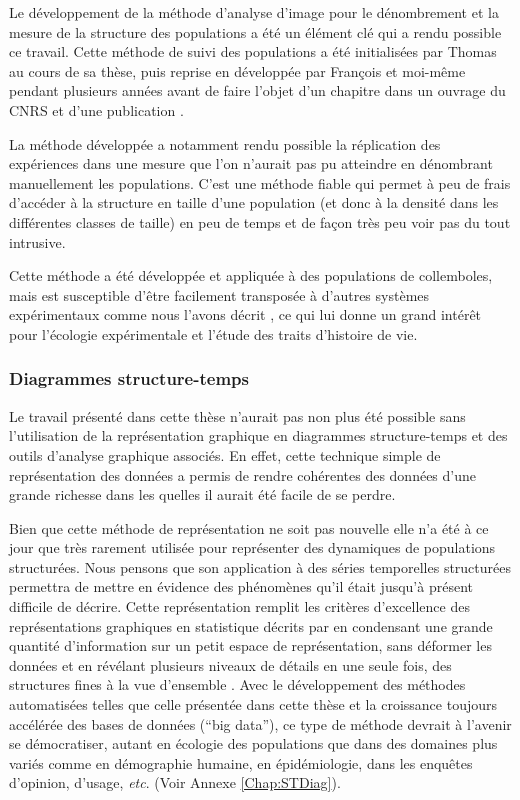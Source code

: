 Le développement de la méthode d'analyse d'image pour le dénombrement et la
mesure de la structure des populations a été un élément clé qui a rendu possible
ce travail. Cette méthode de suivi des populations a été initialisées par Thomas
\textcites{tully2004a} au cours de sa thèse, puis reprise en développée par
François \textcites{mallard2013b} et moi-même pendant plusieurs années avant de
faire l'objet d'un chapitre dans un ouvrage du CNRS \autocites{le-galliard2012a}
et d'une publication \autocites{mallard2013a}.

La méthode développée a notamment rendu possible la réplication des expériences
dans une mesure que l'on n'aurait pas pu atteindre en dénombrant manuellement
les populations. C'est une méthode fiable qui permet à peu de frais d'accéder à la
structure en taille d'une population (et donc à la densité dans les différentes
classes de taille) en peu de temps et de façon très peu voir pas du tout
intrusive.

Cette méthode a été développée et appliquée à des populations de collemboles,
mais est susceptible d'être facilement transposée à d'autres systèmes
expérimentaux comme nous l'avons décrit \autocites{mallard2013a}, ce qui lui
donne un grand intérêt pour l'écologie expérimentale et l'étude des traits
d'histoire de vie.

\subsubsection{Diagrammes structure-temps}

Le travail présenté dans cette thèse n'aurait pas non plus été possible sans
l'utilisation de la représentation graphique en diagrammes structure-temps et
des outils d'analyse graphique associés. En effet, cette technique simple de
représentation des données a permis de rendre cohérentes des données d'une
grande richesse dans les quelles il aurait été facile de se perdre.

Bien que cette méthode de représentation ne soit pas nouvelle elle n'a été à ce
jour que très rarement utilisée pour représenter des dynamiques de populations
structurées. Nous pensons que son application à des séries temporelles
structurées permettra de mettre en évidence des phénomènes qu'il était jusqu'à
présent difficile de décrire. Cette représentation remplit les critères
d'excellence des représentations graphiques en statistique décrits par
\textcites{tufte1990a} en condensant une grande quantité d'information sur un
petit espace de représentation, sans déformer les données et en révélant
plusieurs niveaux de détails en une seule fois, des structures fines à la vue
d'ensemble \autocites{tufte2001a}. Avec le développement des méthodes
automatisées telles que celle présentée dans cette thèse \autocites[voir aussi
][]{le-galliard2012a} et la croissance toujours accélérée des bases de données
(``big data''), ce type de méthode devrait à l'avenir se démocratiser, autant en
écologie des populations que dans des domaines plus variés comme en démographie
humaine, en épidémiologie, dans les enquêtes d'opinion, d'usage, \textit{etc}.
(Voir Annexe \ref{Chap:STDiag}).

